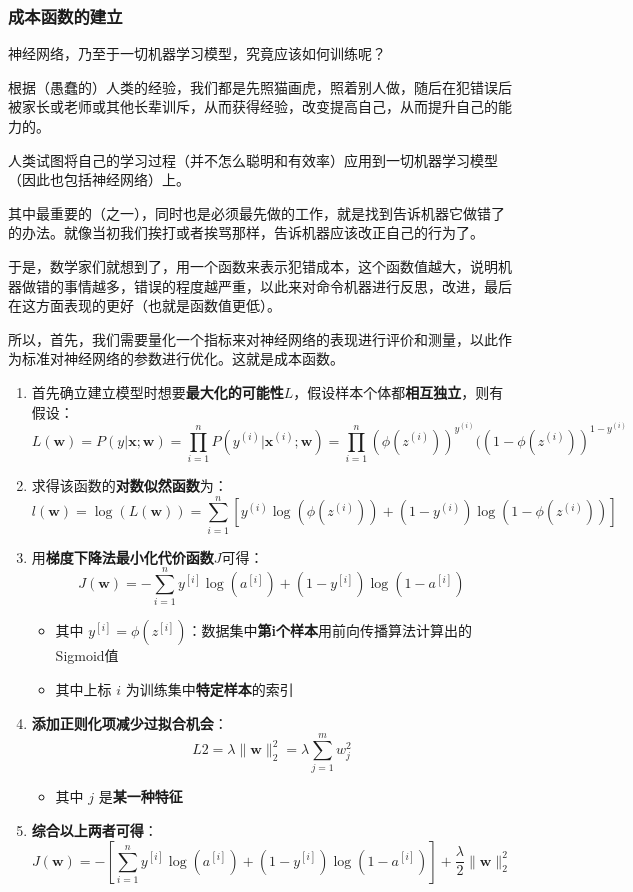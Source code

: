 \documentclass[UTF8]{ctexart}
\begin{document}
\subsubsection{成本函数的建立}
神经网络，乃至于一切机器学习模型，究竟应该如何训练呢？
\par
根据（愚蠢的）人类的经验，我们都是先照猫画虎，照着别人做，随后在犯错误后被家长或老师或其他长辈训斥，从而获得经验，改变提高自己，从而提升自己的能力的。
\par
人类试图将自己的学习过程（并不怎么聪明和有效率）应用到一切机器学习模型（因此也包括神经网络）上。
\par
其中最重要的（之一），同时也是必须最先做的工作，就是找到告诉机器它做错了的办法。就像当初我们挨打或者挨骂那样，告诉机器应该改正自己的行为了。
\par
于是，数学家们就想到了，用一个函数来表示犯错成本，这个函数值越大，说明机器做错的事情越多，错误的程度越严重，以此来对命令机器进行反思，改进，最后在这方面表现的更好（也就是函数值更低）。
\par
所以，首先，我们需要量化一个指标来对神经网络的表现进行评价和测量，以此作为标准对神经网络的参数进行优化。这就是成本函数。
\begin{enumerate}
	\item 首先确立建立模型时想要{\bfseries 最大化的可能性}$L$，假设样本个体都{\bfseries 相互独立}，则有假设： $$L(\pmb w)=P(y|\pmb x;\pmb w) = \prod_{i=1}^nP(y^{(i)} | \pmb x^{(i)};\pmb w)=\prod_{i=1}^n(\phi(z^{(i)}))^{y^{(i)}}((1-\phi(z^{(i)}))^{1-y^{(i)}}$$
	\item 求得该函数的{\bfseries 对数似然函数}为： $$l(\pmb w) = \log(L(\pmb w)) = \sum_{i=1}^n[y^{(i)}\log(\phi(z^{(i)})) + (1-y^{(i)})\log(1-\phi(z^{(i)}))]$$
	\item 用{\bfseries 梯度下降法最小化代价函数}$J$可得： $$J(\pmb w) = -\sum_{i=1}^ny^{[i]}\log(a^{[i]}) + (1-y^{[i]})\log(1-a^{[i]})$$ \begin{itemize}
		\item 其中 $y^{[i]} = \phi(z^{[i]})$：数据集中{\bfseries 第i个样本}用前向传播算法计算出的Sigmoid值
		\item 其中上标 $i$ 为训练集中{\bfseries 特定样本}的索引
	\end{itemize}
	\item {\bfseries 添加正则化项减少过拟合机会}： $$L2 = \lambda \|\pmb w\|_2^2 = \lambda\sum_{j=1}^mw_j^2$$ \begin{itemize}
		\item 其中 $j$ 是{\bfseries 某一种特征}
	\end{itemize}
	\item {\bfseries 综合以上两者可得}： $$J(\pmb w) = -[\sum_{i=1}^ny^{[i]}\log(a^{[i]}) + (1-y^{[i]})\log(1-a^{[i]})] + \frac{\lambda}{2}\|\pmb w\|_2^2$$
\end{enumerate}
\end{document}
